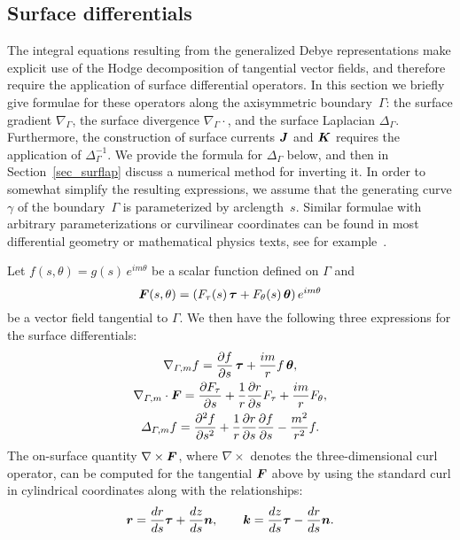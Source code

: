 \documentclass[11pt]{article}
\newcommand{\vct}{\vectorsym}
\newcommand{\surflap}{\Delta_\Gamma}
\newcommand{\surflapm}{\Delta_{\Gamma,m}}
\newcommand{\bF}{\vct{ F}}
\newcommand{\bJ}{\vct{ J}}
\newcommand{\bK}{\vct{ K}}
\newcommand\btheta{\vct{ \theta}}
\newcommand\khat{\vct{{k}}}
\newcommand\rhat{\vct{{r}}}
\newcommand\tauhat{\vct{{ \tau}}}
\newcommand\nhat{\vct{ {n}}}
\newcommand\btau{\vct{\tau}}
\numberwithin{equation}{section}
\begin{document}
\subsection{Surface differentials}
\label{sec_differentials}

The integral equations resulting from the generalized Debye
representations make explicit use of the Hodge decomposition of
tangential vector fields, and therefore require the application of
surface differential operators.
In this section we briefly give formulae for these
operators along the axisymmetric boundary~$\Gamma$: 
the surface gradient $\nabla_\Gamma$, the surface
divergence $\nabla_\Gamma \cdot$, and the surface Laplacian
$\surflap$. Furthermore, the construction of surface currents
$\bJ$ and $\bK$ requires the application of $\surflap^{-1}$. We
provide the formula for $\surflap$ below, and then in
Section~\ref{sec_surflap} discuss a numerical method for inverting it.
In order to somewhat simplify the resulting
expressions, we assume that the generating curve $\gamma$ of the
boundary~$\Gamma$ is parameterized by arclength~$s$.  Similar formulae
with arbitrary parameterizations 
or  curvilinear coordinates can be found in most differential
geometry or mathematical physics texts, see for 
example~\cite{nedelec,frankel}.

Let \mbox{$f(s,\theta) = g(s)\, e^{im\theta}$} be a scalar
function defined on $\Gamma$ and
\[
\bF(s,\theta) = (F_\tau(s) \, \btau + F_\theta(s) \, \btheta) \,
  e^{im\theta}
\]
be a vector field tangential to $\Gamma$. We then have the following
three expressions for the surface differentials:
\begin{equation}\label{eq-surfops}
  \begin{gathered}
    \nabla_{\Gamma,m} f = \frac{\partial f}{\partial s} \, \btau  + \frac{im}{r}
f \, \btheta , \\
\nabla_{\Gamma,m} \cdot \bF = \frac{\partial F_\tau}{\partial s} +
\frac{1}{r} \frac{\partial r}{\partial s} F_\tau  + \frac{im}{r}
F_\theta, \\
\surflapm f = \frac{\partial^2 f}{\partial s^2} + 
\frac{1}{r} \frac{\partial r}{\partial s} \frac{\partial f}{\partial
  s} - \frac{m^2}{r^2} f.
\end{gathered}
\end{equation}
The on-surface quantity $\nabla \times \bF$, where $\nabla \times $
denotes the three-dimensional curl operator, can be computed for the
tangential $\bF$ above by using the standard curl in cylindrical
coordinates along with the relationships:
\begin{equation}
    \rhat = \frac{dr}{ds} \tauhat + 
    \frac{dz}{ds} \nhat, \qquad 
    \khat = \frac{dz}{ds} \tauhat -
    \frac{d r}{ds} \nhat. \\
\end{equation}
\end{document}
